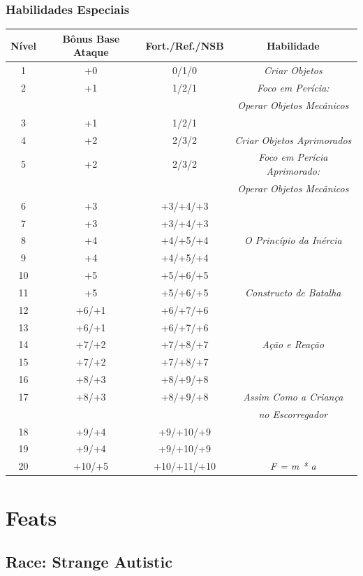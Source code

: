 \documentclass[ letterpaper,12pt]{article}
\begin{document}
\subsubsection{Habilidades Especiais}
\begin{center} \begin{tabular}{|c||c|c|c|}
\hline
{\bf Nível}&{\bf Bônus Base Ataque}&{\bf Fort./Ref./NSB}&{\bf Habilidade}\\
\hline
1&+0&0/1/0&{\it Criar Objetos }\\
\hline
2&+1&1/2/1&{\it Foco em Perícia:}\\
 & & & {\it Operar Objetos Mecânicos}\\
\hline
3&+1&1/2/1&\\
\hline
4&+2&2/3/2&{\it Criar Objetos Aprimorados}\\
\hline
5&+2&2/3/2&{\it Foco em Perícia Aprimorado:}\\
&&&{\it Operar Objetos Mecânicos}\\
\hline
6&+3&+3/+4/+3&\\
\hline
7&+3&+3/+4/+3&\\
\hline
8&+4&+4/+5/+4&{\it O Princípio da Inércia}\\
\hline
9&+4&+4/+5/+4&\\
\hline
10&+5&+5/+6/+5&\\
\hline
11&+5&+5/+6/+5&{\it Constructo de Batalha}\\
\hline
12&+6/+1&+6/+7/+6&\\
\hline
13&+6/+1&+6/+7/+6&\\
\hline
14&+7/+2&+7/+8/+7&{\it Ação e Reação}\\
\hline
15&+7/+2&+7/+8/+7&\\
\hline
16&+8/+3&+8/+9/+8&\\
\hline
17&+8/+3&+8/+9/+8&{\it Assim Como a Criança}\\
  &  &  &{\it no Escorregador}\\
\hline
18&+9/+4&+9/+10/+9&\\
\hline
19&+9/+4&+9/+10/+9&\\
\hline
20&+10/+5&+10/+11/+10&{\it F = m * a}\\
\hline
\end{tabular} \end{center}

\section{Feats}

\subsection{Race: Strange Autistic}
\end{document}
